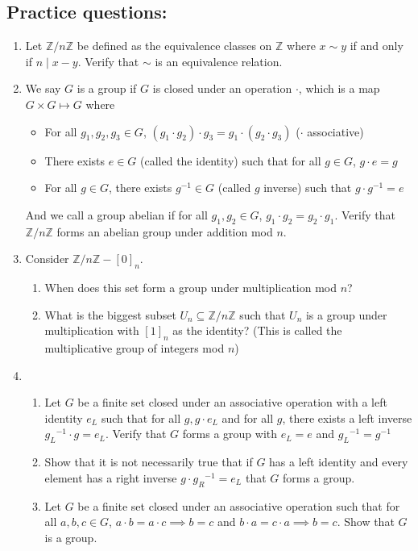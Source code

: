 \documentclass[letterpaper,12pt]{article}
\begin{document}
\subsection*{Practice questions:}
\begin{enumerate}
\item Let $\mathbb{Z}/n\mathbb{Z}$ be defined as the equivalence classes on $\mathbb{Z}$ where $x \sim y$ if and only if $n \mid x-y$. Verify that $\sim$ is an equivalence relation.
\item We say $G$ is a group if $G$ is closed under an operation $\cdot$, which is a map $G \times G \mapsto G$ where \begin{itemize}
    \item For all $g_1,g_2,g_3 \in G$, $(g_1\cdot g_2)\cdot g_3 = g_1\cdot(g_2 \cdot g_3)$ ($\cdot$ associative)
    \item There exists $e \in G$ (called the identity) such that for all $g \in G$, $g \cdot e = g$
    \item For all $g \in G$, there exists $g^{-1} \in G$ (called $g$ inverse) such that $g \cdot g^{-1} =  e$
\end{itemize}
And we call a group abelian if for all $g_1,g_2 \in G$, $g_1 \cdot g_2 = g_2 \cdot g_1$. Verify that $\mathbb{Z}/n\mathbb{Z}$ forms an abelian group under addition mod $n$.
\item Consider $\mathbb{Z}/n\mathbb{Z} - [0]_n$. \begin{enumerate}
    \item When does this set form a group under multiplication mod $n$?
    \item What is the biggest subset $U_n \subseteq \mathbb{Z}/n\mathbb{Z}$ such that $U_n$ is a group under multiplication with $[1]_n$ as the identity? (This is called the multiplicative group of integers mod $n$)
\end{enumerate} 
\item \begin{enumerate}
    \item Let $G$ be a finite set closed under an associative operation with a left identity $e_L$ such that for all $g, g\cdot e_L$ and for all $g$, there exists a left inverse ${g_L}^{-1} \cdot g = e_L$. Verify that $G$ forms a group with $e_L = e$ and ${g_L}^{-1}=g^{-1}$
    \item Show that it is not necessarily true that if $G$ has a left identity and every element has a right inverse $g \cdot {g_R}^{-1}  = e_L$ that $G$ forms a group.
    \item Let $G$ be a finite set closed under an associative operation such that for all $a,b,c \in G$, $a\cdot b = a \cdot c \implies b = c$ and $b\cdot a = c\cdot a \implies b=c$. Show that $G$ is a group.

\end{enumerate}
\end{enumerate}
\end{document}
